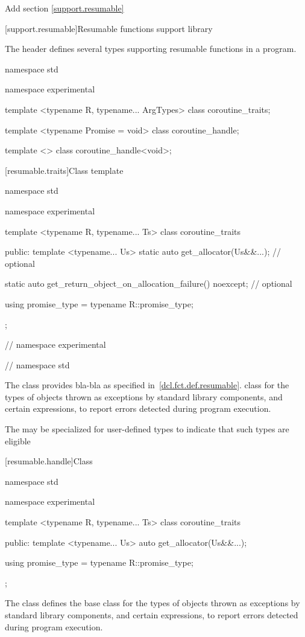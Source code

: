 Add section \ref{support.resumable}

\setcounter{section}{10}
[support.resumable]{Resumable functions support library}

\pnum
The header
\tcode{<experimental/resumable]>}
defines several types supporting resumable functions in a \Cpp program.


%
%
\begin{codeblock}
	namespace std {
	namespace experimental {
		template <typename R, typename... ArgTypes>
		  class coroutine_traits;
		
		template <typename Promise = void>
		class coroutine_handle;		

		template <> class coroutine_handle<void>;		
	}
	}
\end{codeblock}

[resumable.traits]{Class template }

%
\begin{codeblock}
namespace std {
namespace experimental {
  template <typename R, typename... Ts>
  class coroutine_traits {
  public:
    template <typename... Us>
      static auto get_allocator(Us&&...); // optional
			
    static auto get_return_object_on_allocation_failure() noexcept; // optional
			
	using promise_type = typename R::promise_type;
  };
} // namespace experimental
} // namespace std
\end{codeblock}

\pnum
The class
provides bla-bla as specified in~\ref{dcl.fct.def.resumable}.
class for the types of objects thrown as exceptions by
\Cpp standard library components, and certain
expressions, to report errors detected during program execution.

\pnum
The  may be specialized for user-defined types 
to indicate that such types are eligible


[resumable.handle]{Class }

%
\begin{codeblock}
namespace std {
namespace experimental {
  template <typename R, typename... Ts>
  class coroutine_traits {
  public:
    template <typename... Us>
    auto get_allocator(Us&&...);
				
    using promise_type = typename R::promise_type;
  };
}
}
\end{codeblock}

\pnum
The class
defines the base
class for the types of objects thrown as exceptions by
\Cpp standard library components, and certain
expressions, to report errors detected during program execution.
